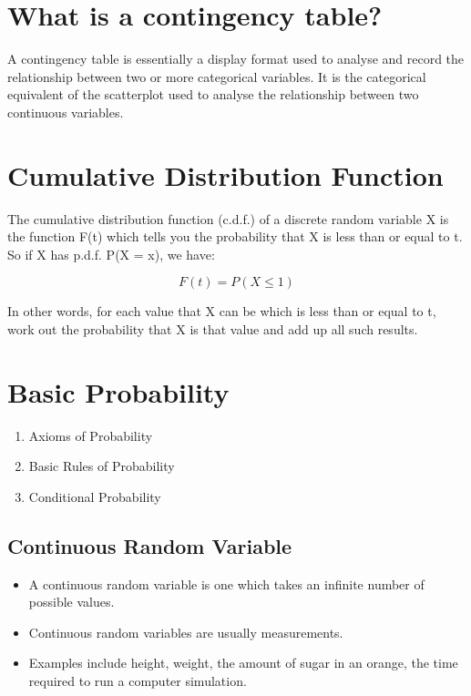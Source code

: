 \documentclass[]{report}
\begin{document}
{{{{{\section{What is a contingency table?}

A contingency table is essentially a display format used to analyse and record the relationship between two or more categorical variables. It is the categorical equivalent of the scatterplot used to analyse the relationship between two continuous variables.


\section{Cumulative Distribution Function}

The cumulative distribution function (c.d.f.) of a discrete random variable X is the function F(t) which tells you the probability that X is less than or equal to t. So if X has p.d.f. P(X = x), we have:

\[F(t) = P(X \leq 1)\] %

In other words, for each value that X can be which is less than or equal to t, work out the probability that X is that value and add up all such results.








\section{Basic Probability}

\begin{enumerate}
\item Axioms of Probability
\item Basic Rules of Probability
\item Conditional Probability
\end{enumerate}

\subsection{Continuous Random Variable}
\begin{itemize} \item
A continuous random variable is one which takes an infinite number of possible values. \item Continuous random variables are usually measurements. \item Examples include height, weight, the amount of sugar in an orange, the time required to run a computer simulation. \end{itemize}

}}}}}
\end{document}
